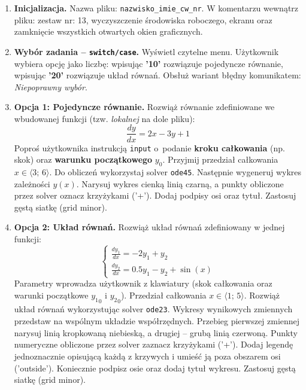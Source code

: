 \documentclass[a4paper,11pt]{article}
\begin{document}
\begin{enumerate}[leftmargin=*, label=\textbf{\arabic*.}, itemsep=2pt]

  \item \textbf{Inicjalizacja.}
    Nazwa pliku: \texttt{nazwisko\_imie\_cw\_nr}. W komentarzu wewnątrz pliku: zestaw nr: 13, wyczyszczenie środowiska roboczego, ekranu oraz zamknięcie wszystkich otwartych okien graficznych.

  \item \textbf{Wybór zadania -- \texttt{switch/case}.}
    Wyświetl czytelne menu. Użytkownik wybiera opcję jako liczbę: wpisując \textbf{'10'} rozwiązuje pojedyncze równanie, wpisując \textbf{'20'} rozwiązuje układ równań. Obsłuż wariant błędny komunikatem: \textit{Niepoprawny wybór}.

  \item \textbf{Opcja 1: Pojedyncze równanie.}
    Rozwiąż równanie zdefiniowane we wbudowanej funkcji (tzw. \textit{lokalnej} na dole pliku):
    \[ \frac{dy}{dx} = 2x - 3y + 1 \]
    Poproś użytkownika instrukcją \texttt{input} o~podanie \textbf{kroku całkowania} (np. skok) oraz \textbf{warunku początkowego} $y_0$. Przyjmij przedział całkowania $x \in \langle 3;\,6 \rangle$.
    Do obliczeń wykorzystaj solver \texttt{ode45}. Następnie wygeneruj wykres zależności $y(x)$. Narysuj wykres cienką linią czarną, a punkty obliczone przez solver oznacz krzyżykami ('+'). Dodaj podpisy osi oraz tytuł. Zastosuj gęstą siatkę (grid minor).

  \item \textbf{Opcja 2: Układ równań.}
    Rozwiąż układ równań zdefiniowany w jednej funkcji:\\[-0.5em]
    \[
    \begin{cases}
      \frac{dy_1}{dx} = -2y_1 + y_2 \\
      \frac{dy_2}{dx} = 0.5y_1 - y_2 + \sin(x)
    \end{cases}
    \]
    Parametry wprowadza użytkownik z klawiatury (skok całkowania oraz warunki początkowe $ {y_1}_{0} $ i $ {y_2}_{0} $). Przedział całkowania $x \in \langle 1;\,5 \rangle$.
    Rozwiąż układ równań wykorzystując solver \texttt{ode23}. Wykresy wynikowych zmiennych przedstaw na wspólnym układzie współrzędnych. Przebieg pierwszej zmiennej narysuj linią kropkowaną niebieską, a drugiej -- grubą linią czerwoną. Punkty numeryczne obliczone przez solver zaznacz krzyżykami ('+'). Dodaj legendę jednoznacznie opisującą każdą z krzywych i umieść ją poza obszarem osi ('outside'). Koniecznie podpisz osie oraz dodaj tytuł wykresu. Zastosuj gęstą siatkę (grid minor).

\end{enumerate}
\end{document}
